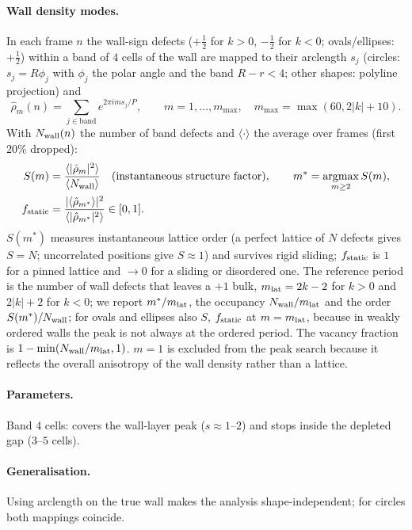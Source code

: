 \paragraph{Wall density modes.} In each frame $n$ the wall-sign defects ($+\tfrac12$ for $k>0$, $-\tfrac12$ for $k<0$; ovals/ellipses:
$+\tfrac12$) within a band of $4$ cells of the wall are mapped to their arclength $s_j$ (circles: $s_j=R\phi_j$ with $\phi_j$ the polar angle
and the band $R-r<4$; other shapes: polyline projection) and
\begin{equation}
  \hat\rho_m(n)=\sum_{j\in\text{band}}e^{2\pi i m s_j/P},\qquad m=1,\dots,m_{\max},\quad m_{\max}=\max(60,2|k|+10).
\end{equation}
With $N_{\rm wall}(n)$ the number of band defects and $\langle\cdot\rangle$ the average over frames (first $20\%$ dropped):
\begin{align}
  S(m)&=\frac{\langle|\hat\rho_m|^2\rangle}{\langle N_{\rm wall}\rangle}\quad\text{(instantaneous structure factor)},\qquad
  m^*=\operatorname*{argmax}_{m\ge2}S(m),\\
  f_{\rm static}&=\frac{|\langle\hat\rho_{m^*}\rangle|^2}{\langle|\hat\rho_{m^*}|^2\rangle}\in[0,1].
\end{align}
$S(m^*)$ measures instantaneous lattice order (a perfect lattice of $N$ defects gives $S=N$; uncorrelated positions give $S\approx1$) and
survives rigid sliding; $f_{\rm static}$ is $1$ for a pinned lattice and $\to0$ for a sliding or disordered one. The reference period is the
number of wall defects that leaves a $+1$ bulk, $m_{\rm lat}=2k-2$ for $k>0$ and $2|k|+2$ for $k<0$; we report $m^*/m_{\rm lat}$, the occupancy
$N_{\rm wall}/m_{\rm lat}$ and the order $S(m^*)/N_{\rm wall}$; for ovals and ellipses also $S$, $f_{\rm static}$ at $m=m_{\rm lat}$, because in
weakly ordered walls the peak is not always at the ordered period. The vacancy fraction is $1-\min(N_{\rm wall}/m_{\rm lat},1)$.
$m=1$ is excluded from the peak search because it reflects the overall anisotropy of the wall density rather than a lattice.

\paragraph{Parameters.} Band $4$ cells: covers the wall-layer peak ($s\approx1$--$2$) and stops inside the depleted gap ($3$--$5$ cells).

\paragraph{Generalisation.} Using arclength on the true wall makes the analysis shape-independent; for circles both mappings coincide.

